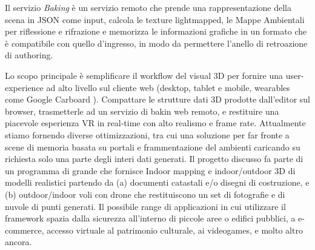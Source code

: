Il servizio \emph{Baking} \`e un servizio remoto che prende una rappresentazione della scena in JSON come input,
calcola le texture lightmapped, le Mappe Ambientali per riflessione e rifrazione e memorizza le informazioni grafiche
in un formato che \`e compatibile con quello d'ingresso, in modo da permettere l'anello di retroazione di authoring.


Lo scopo principale \`e semplificare il workflow del visual 3D per fornire una user-experience ad alto livello
sul cliente web (desktop, tablet e mobile, wearables come Google Carboard ).
Compattare le strutture dati 3D prodotte dall'editor sul browser, trasmetterle ad un servizio di bakin web remoto,
e restituire una piacevole esperienza VR in real-time con alto realismo e frame rate.
Attualmente stiamo fornendo diverse ottimizzazioni, tra cui una soluzione per far fronte a scene di memoria basata
 su portali e frammentazione del ambienti caricando su richiesta solo una parte degli interi dati generati.
Il progetto discusso fa parte di un programma di grande che fornisce Indoor mapping e indoor/outdoor 3D di modelli realistici
partendo da (a) documenti catastali e/o disegni di costruzione, e (b) outdoor/indoor voli con drone che restituiscono
un set di fotografie e di nuvole di punti generati.
Il possibile range di applicazioni in cui utilizzare il framework spazia dalla sicurezza all'interno di piccole aree o edifici pubblici, a e-commerce,
accesso virtuale al patrimonio culturale, ai videogames, e molto altro ancora.


